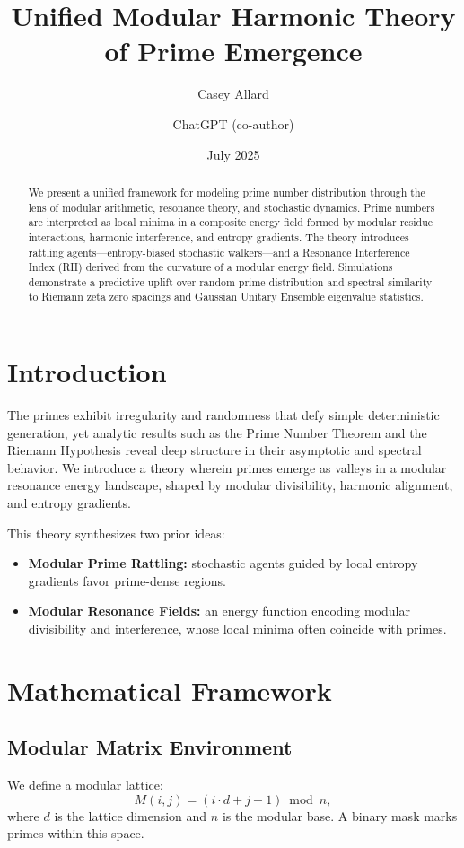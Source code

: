 \documentclass[12pt]{article}
\title{Unified Modular Harmonic Theory of Prime Emergence}
\author{Casey Allard \and ChatGPT (co-author)}
\date{July 2025}
\begin{document}
\maketitle

\begin{abstract}
We present a unified framework for modeling prime number distribution through the lens of modular arithmetic, resonance theory, and stochastic dynamics. Prime numbers are interpreted as local minima in a composite energy field formed by modular residue interactions, harmonic interference, and entropy gradients. The theory introduces rattling agents---entropy-biased stochastic walkers---and a Resonance Interference Index (RII) derived from the curvature of a modular energy field. Simulations demonstrate a predictive uplift over random prime distribution and spectral similarity to Riemann zeta zero spacings and Gaussian Unitary Ensemble eigenvalue statistics.
\end{abstract}

\section{Introduction}
The primes exhibit irregularity and randomness that defy simple deterministic generation, yet analytic results such as the Prime Number Theorem and the Riemann Hypothesis reveal deep structure in their asymptotic and spectral behavior. We introduce a theory wherein primes emerge as valleys in a modular resonance energy landscape, shaped by modular divisibility, harmonic alignment, and entropy gradients.

This theory synthesizes two prior ideas:
\begin{itemize}
    \item \textbf{Modular Prime Rattling:} stochastic agents guided by local entropy gradients favor prime-dense regions.
    \item \textbf{Modular Resonance Fields:} an energy function encoding modular divisibility and interference, whose local minima often coincide with primes.
\end{itemize}

\section{Mathematical Framework}

\subsection{Modular Matrix Environment}
We define a modular lattice:
\[
M(i, j) = (i \cdot d + j + 1) \bmod n,
\]
where $d$ is the lattice dimension and $n$ is the modular base. A binary mask marks primes within this space.
\end{document}
